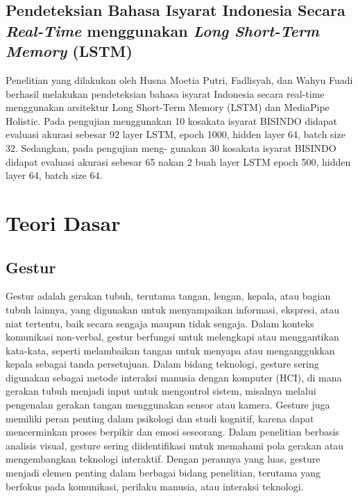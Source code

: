 \subsection{Pendeteksian Bahasa Isyarat Indonesia Secara \emph{Real-Time} menggunakan \emph{Long Short-Term Memory} (LSTM)}
Penelitian yang dilakukan oleh Husna Moetia Putri, Fadlisyah, dan Wahyu Fuadi berhasil
melakukan pendeteksian bahasa isyarat Indonesia secara real-time menggunakan arsitektur Long
Short-Term Memory (LSTM) dan MediaPipe Holistic. Pada pengujian menggunakan 10 kosakata
isyarat BISINDO didapat evaluasi akurasi sebesar 92%
layer LSTM, epoch 1000, hidden layer 64, batch size 32. Sedangkan, pada pengujian meng-
gunakan 30 kosakata isyarat BISINDO didapat evaluasi akurasi sebesar 65%
nakan 2 buah layer LSTM epoch 500, hidden layer 64, batch size 64. 

\section{Teori Dasar}
\subsection{Gestur}
Gestur adalah gerakan tubuh, terutama tangan, lengan, kepala, atau bagian tubuh lainnya, yang digunakan untuk menyampaikan informasi, ekspresi, atau niat tertentu, baik secara sengaja maupun tidak sengaja. Dalam konteks komunikasi non-verbal, gestur berfungsi untuk melengkapi atau menggantikan kata-kata, seperti melambaikan tangan untuk menyapa atau menganggukkan kepala sebagai tanda persetujuan. Dalam bidang teknologi, gesture sering digunakan sebagai metode interaksi manusia dengan komputer (HCI), di mana gerakan tubuh menjadi input untuk mengontrol sistem, misalnya melalui pengenalan gerakan tangan menggunakan sensor atau kamera. Gesture juga memiliki peran penting dalam psikologi dan studi kognitif, karena dapat mencerminkan proses berpikir dan emosi seseorang. Dalam penelitian berbasis analisis visual, gesture sering diidentifikasi untuk memahami pola gerakan atau mengembangkan teknologi interaktif. Dengan perannya yang luas, gesture menjadi elemen penting dalam berbagai bidang penelitian, terutama yang berfokus pada komunikasi, perilaku manusia, atau interaksi teknologi.
